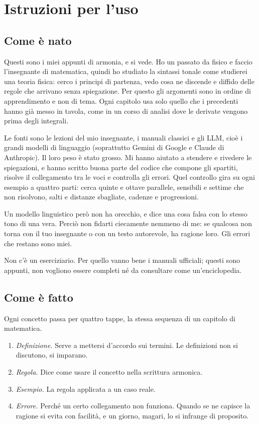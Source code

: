 \chapter*{Istruzioni per l'uso}


\section*{Come è nato}

Questi sono i miei appunti di armonia, e si vede. Ho un passato da fisico e faccio l'insegnante di matematica, quindi ho studiato la sintassi tonale come studierei una teoria fisica: cerco i principi di partenza, vedo cosa ne discende e diffido delle regole che arrivano senza spiegazione. Per questo gli argomenti sono in ordine di apprendimento e non di tema. Ogni capitolo usa solo quello che i precedenti hanno già messo in tavola, come in un corso di analisi dove le derivate vengono prima degli integrali.

Le fonti sono le lezioni del mio insegnante, i manuali classici e gli LLM, cioè i grandi modelli di linguaggio (soprattutto Gemini di Google e Claude di Anthropic). Il loro peso è stato grosso. Mi hanno aiutato a stendere e rivedere le spiegazioni, e hanno scritto buona parte del codice che compone gli spartiti, risolve il collegamento tra le voci e controlla gli errori. Quel controllo gira su ogni esempio a quattro parti: cerca quinte e ottave parallele, sensibili e settime che non risolvono, salti e distanze sbagliate, cadenze e progressioni.

Un modello linguistico però non ha orecchio, e dice una cosa falsa con lo stesso tono di una vera. Perciò non fidarti ciecamente nemmeno di me: se qualcosa non torna con il tuo insegnante o con un testo autorevole, ha ragione loro. Gli errori che restano sono miei.

Non c'è un eserciziario. Per quello vanno bene i manuali ufficiali; questi sono appunti, non vogliono essere completi né da consultare come un'enciclopedia.

\section*{Come è fatto}

Ogni concetto passa per quattro tappe, la stessa sequenza di un capitolo di matematica.
\begin{enumerate}
	\item \textit{Definizione.} Serve a mettersi d'accordo sui termini. Le definizioni non si discutono, si imparano.
	\item \textit{Regola.} Dice come usare il concetto nella scrittura armonica.
	\item \textit{Esempio.} La regola applicata a un caso reale.
	\item \textit{Errore.} Perché un certo collegamento non funziona. Quando se ne capisce la ragione si evita con facilità, e un giorno, magari, lo si infrange di proposito.
\end{enumerate}

